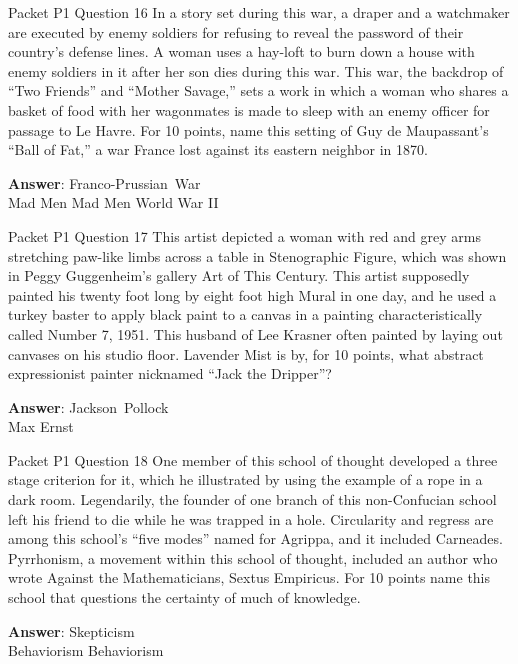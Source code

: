 \begin{frame}{Packet P1 Question 16}
In a story set during this war, a draper and   a watchmaker are executed by enemy soldiers for refusing to reveal the password of their country's   defense lines. A woman uses a hay-loft to burn down a house with enemy soldiers in it after her son dies during this war. This war, the backdrop of ``Two Friends'' and “Mother Savage,” sets a work in which a woman who shares a basket of food with her wagonmates is made to sleep with an enemy officer for passage to Le Havre. For 10 points, name this setting of Guy de Maupassant's ``Ball of Fat,'' a war   France lost against its eastern neighbor in 1870.    

\textbf{Answer}: Franco-Prussian\ War\\
 Mad Men
 Mad Men
 World War II
\end{frame}

\begin{frame}{Packet P1 Question 17}
This artist depicted a woman with red and grey arms stretching paw-like limbs across a table in Stenographic Figure, which was shown in Peggy Guggenheim's gallery Art of This Century. This artist supposedly   painted his twenty foot long by eight foot high Mural in one day, and he used a turkey baster to apply black paint to a canvas in a painting characteristically called Number 7, 1951. This husband of Lee Krasner often   painted by laying   out canvases on his studio floor. Lavender Mist is by, for 10     points, what abstract expressionist painter nicknamed ``Jack the Dripper''?

\textbf{Answer}: Jackson\ Pollock\\
 Max Ernst
\end{frame}

\begin{frame}{Packet P1 Question 18}
One member of this school of thought developed a three stage criterion for it, which he illustrated by   using the example of a rope in a dark room. Legendarily, the founder of one branch of this non-Confucian school left his friend to die while he was trapped in a hole. Circularity and regress are among this school’s “five modes” named for Agrippa, and it included Carneades. Pyrrhonism, a movement within this school of thought, included an author who wrote Against the Mathematicians, Sextus Empiricus.   For 10 points name   this school that   questions the certainty of much of knowledge.  

\textbf{Answer}: Skepticism\\
 Behaviorism
 Behaviorism
\end{frame}

